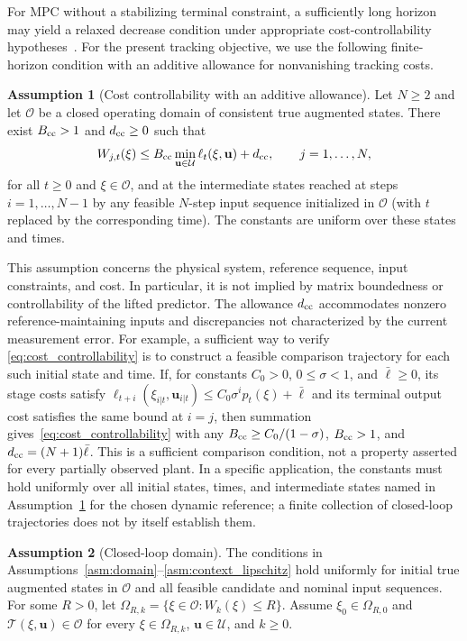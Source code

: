 \documentclass[journal]{IEEEtran}
\newcommand{\vu}{\mathbf{u}}
\theoremstyle{plain}
\theoremstyle{definition}
\newtheorem{assumption}{Assumption}
\theoremstyle{definition}
\begin{document}
For MPC without a stabilizing terminal constraint, a sufficiently long
horizon may yield a relaxed decrease condition under appropriate
cost-controllability hypotheses~\cite{grune2010analysis,coron2020model}.
For the present tracking objective, we use the following finite-horizon
condition with an additive allowance for nonvanishing tracking costs.

\begin{assumption}[Cost controllability with an additive allowance]
\label{asm:cost_controllability}
Let $N\ge2$ and let $\mathcal O$ be a closed operating domain of
consistent true augmented states. There exist $B_{\rm cc}>1$ and
$d_{\rm cc}\ge0$ such that
\begin{equation}
W_{j,t}(\xi)\le B_{\rm cc}\min_{\vu\in\mathcal U}\ell_t(\xi,\vu)
+d_{\rm cc},\qquad j=1,\ldots,N,
\label{eq:cost_controllability}
\end{equation}
for all $t\ge0$ and $\xi\in\mathcal O$, and at the intermediate
states reached at steps $i=1,\ldots,N-1$ by any feasible
$N$-step input sequence initialized in $\mathcal O$ (with $t$
replaced by the corresponding time). The constants are uniform over
these states and times.
\end{assumption}

This assumption concerns the physical system, reference sequence,
input constraints, and cost. In particular, it is not implied by
matrix boundedness or controllability of the lifted predictor. The
allowance $d_{\rm cc}$ accommodates nonzero reference-maintaining
inputs and discrepancies not characterized by the current measurement
error. For example, a sufficient way to verify
\eqref{eq:cost_controllability} is to construct a feasible comparison
trajectory for each such initial state and time. If, for constants
$C_0>0$, $0\le\sigma<1$, and $\bar\ell\ge0$, its stage costs satisfy
$\ell_{t+i}(\xi_{i|t},\vu_{i|t})\le C_0\sigma^i p_t(\xi)+\bar\ell$
and its terminal output cost satisfies the same bound at $i=j$,
then summation gives~\eqref{eq:cost_controllability} with any
$B_{\rm cc}\ge C_0/(1-\sigma)$, $B_{\rm cc}>1$, and
$d_{\rm cc}=(N+1)\bar\ell$. This is a sufficient comparison condition,
not a property asserted for every partially observed plant. In a
specific application, the constants must hold uniformly over all
initial states, times, and intermediate states named in
Assumption~\ref{asm:cost_controllability} for the chosen dynamic
reference; a finite collection of closed-loop trajectories does not
by itself establish them.

\begin{assumption}[Closed-loop domain]
\label{asm:closed_loop_domain}
The conditions in Assumptions~\ref{asm:domain}--\ref{asm:context_lipschitz} hold
uniformly for initial true augmented states in $\mathcal O$ and all
feasible candidate and nominal input sequences. For some $R>0$,
let $\Omega_{R,k}=\{\xi\in\mathcal O:W_k(\xi)\le R\}$. Assume
$\xi_0\in\Omega_{R,0}$ and
$\mathcal T(\xi,\vu)\in\mathcal O$ for every
$\xi\in\Omega_{R,k}$, $\vu\in\mathcal U$, and $k\ge0$.
\end{assumption}
\end{document}
